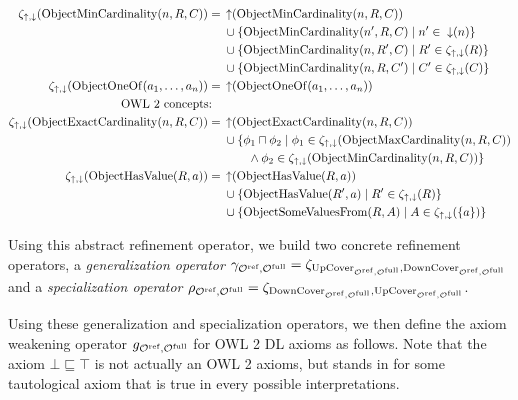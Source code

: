 \begin{definition}
\begin{widepage}
\begin{align*}
     \zeta_{\operatorname{\uparrow}, \operatorname{\downarrow}}(\operatorname{ObjectMinCardinality}(n, R, C)) ={} & \operatorname{\uparrow} (\operatorname{ObjectMinCardinality}(n, R, C)) \\& \cup \{\operatorname{ObjectMinCardinality}(n', R, C) \mid n' \in \; \operatorname{\downarrow} (n)\} \\& \cup \{\operatorname{ObjectMinCardinality}(n, R', C) \mid R' \in \zeta_{\operatorname{\uparrow}, \operatorname{\downarrow}}(R)\} \\& \cup \{\operatorname{ObjectMinCardinality}(n, R, C') \mid C' \in \zeta_{\operatorname{\uparrow}, \operatorname{\downarrow}} (C)\} \\
     \zeta_{\operatorname{\uparrow}, \operatorname{\downarrow}}(\operatorname{ObjectOneOf}(a_1, \dots, a_n)) ={} & \operatorname{\uparrow} (\operatorname{ObjectOneOf}(a_1, \dots, a_n)) \\
     \text{OWL 2 concepts:} \quad & \\
     \zeta_{\operatorname{\uparrow}, \operatorname{\downarrow}}(\operatorname{ObjectExactCardinality}(n, R, C)) ={} & \operatorname{\uparrow} (\operatorname{ObjectExactCardinality}(n, R, C)) \\& \cup \{ \phi_1 \sqcap \phi_2 \mid \phi_1 \in \zeta_{\operatorname{\uparrow}, \operatorname{\downarrow}} (\operatorname{ObjectMaxCardinality}(n, R, C)) \\ \;& \qquad \land \phi_2 \in \zeta_{\operatorname{\uparrow}, \operatorname{\downarrow}} (\operatorname{ObjectMinCardinality}(n, R, C)) \} \\
     \zeta_{\operatorname{\uparrow}, \operatorname{\downarrow}}(\operatorname{ObjectHasValue}(R, a)) ={} & \operatorname{\uparrow} (\operatorname{ObjectHasValue}(R, a)) \\& \cup \{\operatorname{ObjectHasValue}(R', a) \mid R' \in \zeta_{\operatorname{\uparrow}, \operatorname{\downarrow}} (R)\} \\& \cup \{\operatorname{ObjectSomeValuesFrom}(R, A) \mid A \in \zeta_{\operatorname{\uparrow}, \operatorname{\downarrow}} (\{a\})\}
    \end{align*}
  \end{widepage}
  Using this abstract refinement operator, we build two concrete refinement operators, a \emph{generalization operator} $\gamma_{{\mathcal{O}^\textnormal{ref}},{\mathcal{O}^\textnormal{full}}} = \zeta_{{\operatorname{UpCover}}_{{\mathcal{O}^\textnormal{ref}},{\mathcal{O}^\textnormal{full}}},{\operatorname{DownCover}}_{{\mathcal{O}^\textnormal{ref}},{\mathcal{O}^\textnormal{full}}}}$ and a \emph{specialization operator} $\rho_{{\mathcal{O}^\textnormal{ref}},{\mathcal{O}^\textnormal{full}}} = \zeta_{{\operatorname{DownCover}}_{{\mathcal{O}^\textnormal{ref}},{\mathcal{O}^\textnormal{full}}},{\operatorname{UpCover}}_{{\mathcal{O}^\textnormal{ref}},{\mathcal{O}^\textnormal{full}}}}$.
\end{definition}

Using these generalization and specialization operators, we then define the axiom weakening operator $g_{{\mathcal{O}^\textnormal{ref}},{\mathcal{O}^\textnormal{full}}}$ for OWL 2 DL axioms as follows. Note that the axiom $\bot \sqsubseteq \top$ is not actually an OWL 2 axioms, but stands in for some tautological axiom that is true in every possible interpretations.

